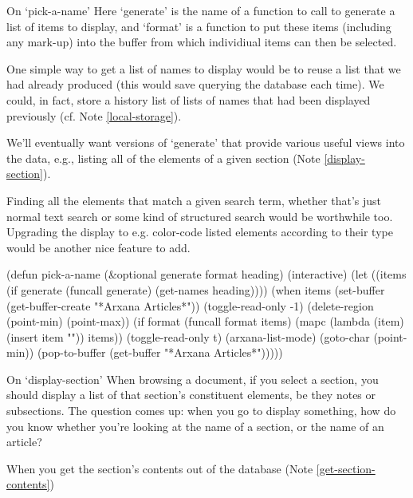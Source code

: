 \begin{notate}{On `pick-a-name'} \label{pick-a-name}
Here `generate' is the name of a function to call to
generate a list of items to display, and `format' is a
function to put these items (including any mark-up) into
the buffer from which individiual items can then be
selected.

One simple way to get a list of names to display would be
to reuse a list that we had already produced (this would
save querying the database each time).  We could, in fact,
store a history list of lists of names that had been
displayed previously (cf. Note \ref{local-storage}).

We'll eventually want versions of `generate' that provide
various useful views into the data, e.g., listing all of
the elements of a given section (Note
\ref{display-section}).

Finding all the elements that match a given search term,
whether that's just normal text search or some kind of
structured search would be worthwhile too.  Upgrading the
display to e.g. color-code listed elements according to
their type would be another nice feature to add.
\end{notate}

\begin{elisp}
(defun pick-a-name (&optional generate format heading)
  (interactive)
  (let ((items (if generate
                   (funcall generate)
                 (get-names heading))))
    (when items
      (set-buffer (get-buffer-create "*Arxana Articles*"))
      (toggle-read-only -1)
      (delete-region (point-min)
                     (point-max))
      (if format
          (funcall format items)
        (mapc (lambda (item) (insert item "\n")) items))
      (toggle-read-only t)
      (arxana-list-mode)
      (goto-char (point-min))
      (pop-to-buffer (get-buffer "*Arxana Articles*")))))
\end{elisp}

\begin{notate}{On `display-section'} \label{display-section}
When browsing a document, if you select a section, you
should display a list of that section's constituent
elements, be they notes or subsections.  The question
comes up: when you go to display something, how do you
know whether you're looking at the name of a section, or
the name of an article?

When you get the section's contents out of the database
(Note \ref{get-section-contents})
\end{notate}

